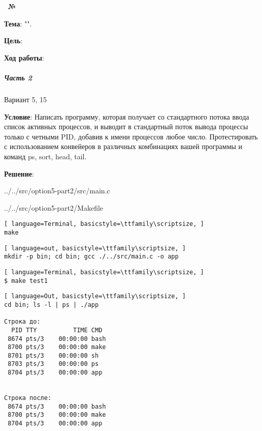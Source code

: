 \begin{center}
    \textbf{\titlePageTypeWork~№\titlePageNumberWork}
\end{center}

\textbf{Тема}: "\titlePageTopic".

\textbf{Цель}: 

\begin{center}
    \textbf{Ход работы}:
\end{center}

\subparagraph{Часть 2} Вариант 5, 15

\textbf{Условие}:
Написать  программу,  которая  получает  со  стандартного  потока  ввода список активных процессов, и выводит в стандартный поток вывода процессы только с четными PID, добавив к имени процессов любое число. Протестировать с использованием конвейеров в различных комбинациях вашей программы и команд ps, sort, head, tail. 

\textbf{Решение}:


{../../src/option5-part2/src/main.c}

\newpage


{../../src/option5-part2/Makefile}


\begin{lstlisting}[ language=Terminal, basicstyle=\ttfamily\scriptsize, ]
make
\end{lstlisting}

\begin{lstlisting}[ language=out, basicstyle=\ttfamily\scriptsize, ]
mkdir -p bin; cd bin; gcc ./../src/main.c -o app
\end{lstlisting}


\begin{lstlisting}[ language=Terminal, basicstyle=\ttfamily\scriptsize, ]
$ make test1
\end{lstlisting}

\begin{lstlisting}[ language=Out, basicstyle=\ttfamily\scriptsize, ]
cd bin; ls -l | ps | ./app

Cтрока до:
  PID TTY          TIME CMD
 8674 pts/3    00:00:00 bash
 8700 pts/3    00:00:00 make
 8701 pts/3    00:00:00 sh
 8703 pts/3    00:00:00 ps
 8704 pts/3    00:00:00 app


Строка после:
 8674 pts/3    00:00:00 bash
 8700 pts/3    00:00:00 make
 8704 pts/3    00:00:00 app
\end{lstlisting}

